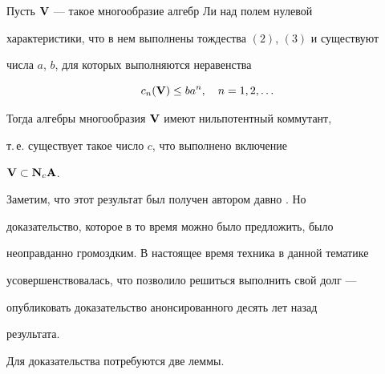\begin{thmnonum}


Пусть $\bold V$ --- такое многообразие алгебр Ли над полем нулевой


характеристики, что в нем выполнены тождества $(2)$, $(3)$ и существуют


числа $a$, $b$, для которых выполняются неравенства


$$


c_n(\bold V)\le b a^n,\quad n=1,2,\dotsc


$$


Тогда алгебры многообразия $\bold V$ имеют нильпотентный коммутант,


т.\,е. существует такое число $c$, что выполнено включение


$\bold V\subset\bold N_c\bold A$.


\end{thmnonum}





Заметим, что этот результат был получен автором давно \cite{6}. Но


доказательство, которое в то время можно было предложить, было


неоправданно громоздким. В настоящее время техника в данной тематике


усовершенствовалась, что позволило решиться выполнить свой долг ---


опубликовать доказательство анонсированного десять лет назад


результата.





Для доказательства потребуются две леммы.





